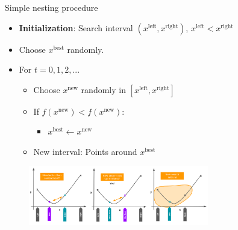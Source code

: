 \documentclass[11pt,compress,t,notes=noshow, xcolor=table]{beamer}
\begin{document}
\begin{vbframe}{Simple nesting procedure}

\begin{itemize}
\item\textbf{Initialization}: Search interval  $(x^{\text{left}}, x^{\text{right}})$, $x^{\text{left}} < x^{\text{right}}$
\item Choose $x^{\text{best}}$ randomly.
\item For $t = 0, 1, 2, ...$
\begin{itemize}
    \item Choose $x^{\text{new}}$ randomly in $[x^{\text{left}}, x^{\text{right}}]$
    \item If $f(x^{\text{new}}) < f(x^{\text{new}})$:
    \begin{itemize}
        \item $x^{\text{best}} \leftarrow x^{\text{new}}$
    \end{itemize}
    \item New interval: Points around $x^{\text{best}}$
\end{itemize}
\end{itemize}

\lz 

\begin{figure}
    \centering
    \includegraphics[width=0.7\textwidth]{figure_man/golden-ratio-summary.png}  
\end{figure}

\end{vbframe}
\end{document}
